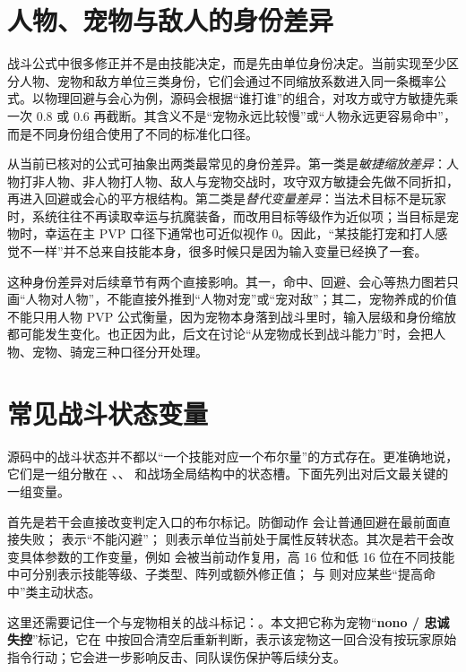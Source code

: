 \section{人物、宠物与敌人的身份差异}

战斗公式中很多修正并不是由技能决定，而是先由单位身份决定。当前实现至少区分人物、宠物和敌方单位三类身份，它们会通过不同缩放系数进入同一条概率公式。以物理回避与会心为例，源码会根据“谁打谁”的组合，对攻方或守方敏捷先乘一次 $0.8$ 或 $0.6$ 再截断。其含义不是“宠物永远比较慢”或“人物永远更容易命中”，而是不同身份组合使用了不同的标准化口径。

从当前已核对的公式可抽象出两类最常见的身份差异。第一类是\emph{敏捷缩放差异}：人物打非人物、非人物打人物、敌人与宠物交战时，攻守双方敏捷会先做不同折扣，再进入回避或会心的平方根结构。第二类是\emph{替代变量差异}：当法术目标不是玩家时，系统往往不再读取幸运与抗魔装备，而改用目标等级作为近似项；当目标是宠物时，幸运在主 PVP 口径下通常也可近似视作 $0$。因此，“某技能打宠和打人感觉不一样”并不总来自技能本身，很多时候只是因为输入变量已经换了一套。

这种身份差异对后续章节有两个直接影响。其一，命中、回避、会心等热力图若只画“人物对人物”，不能直接外推到“人物对宠”或“宠对敌”；其二，宠物养成的价值不能只用人物 PVP 公式衡量，因为宠物本身落到战斗里时，输入层级和身份缩放都可能发生变化。也正因为此，后文在讨论“从宠物成长到战斗能力”时，会把人物、宠物、骑宠三种口径分开处理。

\section{常见战斗状态变量}

源码中的战斗状态并不都以“一个技能对应一个布尔量”的方式存在。更准确地说，它们是一组分散在 、、 和战场全局结构中的状态槽。下面先列出对后文最关键的一组变量。

首先是若干会直接改变判定入口的布尔标记。防御动作  会让普通回避在最前面直接失败； 表示“不能闪避”； 则表示单位当前处于属性反转状态。其次是若干会改变具体参数的工作变量，例如  会被当前动作复用，高 16 位和低 16 位在不同技能中可分别表示技能等级、子类型、阵列或额外修正值； 与  则对应某些“提高命中”类主动状态。

这里还需要记住一个与宠物相关的战斗标记：。本文把它称为宠物“\textbf{nono / 忠诚失控}”标记，它在  中按回合清空后重新判断，表示该宠物这一回合没有按玩家原始指令行动；它会进一步影响反击、同队误伤保护等后续分支。

